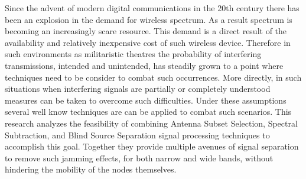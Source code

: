 Since the advent of modern digital communications in the 20th century there has been an explosion in the demand for wireless spectrum. As a result spectrum is becoming an increasingly scare resource. This demand is a direct result of the availability and relatively inexpensive cost of such wireless device. Therefore in such environments as militaristic theatres the probability of interfering transmissions, intended and unintended, has steadily grown to a point where techniques need to be consider to combat such occurrences. More directly, in such situations when interfering signals are partially or completely understood measures can be taken to overcome such difficulties. Under these assumptions several well know techniques are can be applied to combat such scenarios.  This research analyzes the feasibility of combining Antenna Subset Selection, Spectral Subtraction, and Blind Source Separation signal processing techniques to accomplish this goal.  Together they provide multiple avenues of signal separation to remove such jamming effects, for both narrow and wide bands, without hindering the mobility of the nodes themselves.
